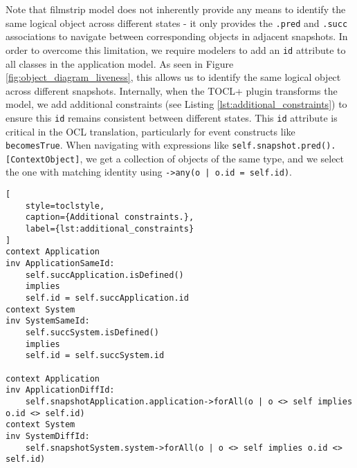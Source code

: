 Note that filmstrip model does not inherently provide any means to identify the same 
logical object across different states - it only provides the \texttt{.pred} and \texttt{.succ} 
associations to navigate between corresponding objects in adjacent snapshots. 
In order to overcome this limitation, we require modelers to add an \texttt{id} attribute 
to all classes in the application model. As seen in Figure \ref{fig:object_diagram_liveness}, 
this allows us to identify the same logical object across different snapshots. 
Internally, when the TOCL+ plugin transforms the model, we add additional 
constraints (see Listing \ref{lst:additional_constraints}) to ensure this \texttt{id} remains consistent between different states. 
This \texttt{id} attribute is critical in the OCL translation, particularly for event 
constructs like \texttt{becomesTrue}. When navigating with expressions like 
\texttt{self.snapshot.pred().[ContextObject]}, we get a collection of objects of the same 
type, and we select the one with matching identity using \texttt{->any(o | o.id = self.id)}.

\begin{lstlisting}[
    style=toclstyle,
    caption={Additional constraints.},
    label={lst:additional_constraints}
]
context Application
inv ApplicationSameId: 
    self.succApplication.isDefined() 
    implies 
    self.id = self.succApplication.id
context System
inv SystemSameId: 
    self.succSystem.isDefined() 
    implies 
    self.id = self.succSystem.id

context Application
inv ApplicationDiffId: 
    self.snapshotApplication.application->forAll(o | o <> self implies o.id <> self.id)
context System
inv SystemDiffId: 
    self.snapshotSystem.system->forAll(o | o <> self implies o.id <> self.id)
\end{lstlisting}

